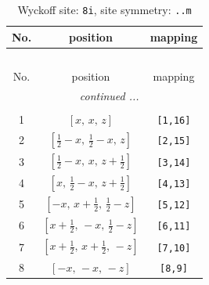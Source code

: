 \documentclass[fleqn,8pt]{jsarticle}
\begin{document}
\begin{longtable}{ccc}
\caption{Wyckoff site: {\tt 8i}, site symmetry: {\tt ..m}}
 \\
 \hline \hline
No. & position & mapping \\ \hline \endfirsthead

\multicolumn{2}{l}{\tablename\ \thetable{}} \\
 \hline \hline
No. & position & mapping \\ \hline \endhead

 \hline \hline
\multicolumn{2}{r}{\footnotesize\it continued ...} \\ \endfoot

 \hline \hline
\multicolumn{2}{r}{} \\ \endlastfoot

1 & $\left[ x,\, x,\, z \right]$ & {\tt [1,16]} \\ \hline
2 & $\left[ \frac{1}{2} - x,\, \frac{1}{2} - x,\, z \right]$ & {\tt [2,15]} \\ \hline
3 & $\left[ \frac{1}{2} - x,\, x,\, z + \frac{1}{2} \right]$ & {\tt [3,14]} \\ \hline
4 & $\left[ x,\, \frac{1}{2} - x,\, z + \frac{1}{2} \right]$ & {\tt [4,13]} \\ \hline
5 & $\left[ - x,\, x + \frac{1}{2},\, \frac{1}{2} - z \right]$ & {\tt [5,12]} \\ \hline
6 & $\left[ x + \frac{1}{2},\, - x,\, \frac{1}{2} - z \right]$ & {\tt [6,11]} \\ \hline
7 & $\left[ x + \frac{1}{2},\, x + \frac{1}{2},\, - z \right]$ & {\tt [7,10]} \\ \hline
8 & $\left[ - x,\, - x,\, - z \right]$ & {\tt [8,9]} \\
\end{longtable}
\renewcommand{\arraystretch}{1.2}
\end{document}
